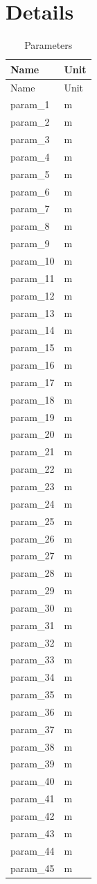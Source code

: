 \section{Details}\label{sec:details}
\begin{longtable}{ll}\caption{Parameters}\label{tab:params}\\\hline Name & Unit\\\hline\endfirsthead
\hline Name & Unit\\\hline\endhead
param_1 & m\\
param_2 & m\\
param_3 & m\\
param_4 & m\\
param_5 & m\\
param_6 & m\\
param_7 & m\\
param_8 & m\\
param_9 & m\\
param_10 & m\\
param_11 & m\\
param_12 & m\\
param_13 & m\\
param_14 & m\\
param_15 & m\\
param_16 & m\\
param_17 & m\\
param_18 & m\\
param_19 & m\\
param_20 & m\\
param_21 & m\\
param_22 & m\\
param_23 & m\\
param_24 & m\\
param_25 & m\\
param_26 & m\\
param_27 & m\\
param_28 & m\\
param_29 & m\\
param_30 & m\\
param_31 & m\\
param_32 & m\\
param_33 & m\\
param_34 & m\\
param_35 & m\\
param_36 & m\\
param_37 & m\\
param_38 & m\\
param_39 & m\\
param_40 & m\\
param_41 & m\\
param_42 & m\\
param_43 & m\\
param_44 & m\\
param_45 & m\\
\hline\end{longtable}
\placeholderemptysection
